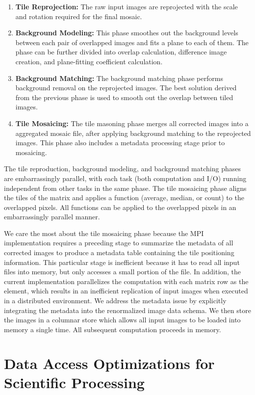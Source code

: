 \documentclass{acm_proc_article-sp}
\begin{document}
\begin{enumerate}
\item \textbf{Tile Reprojection:} The raw input images are reprojected with the scale and rotation required for the
final mosaic. 
\item \textbf{Background Modeling:} This phase smoothes out the background levels between each pair of
overlapped images and fits a plane to each of them. The phase can be further divided into overlap
calculation, difference image creation, and plane-fitting coefficient calculation.
\item \textbf{Background Matching:} The background matching phase performs background removal on the
reprojected images. The best solution derived from the previous phase is used to smooth out the overlap between
tiled images.
\item \textbf{Tile Mosaicing:} The tile masoning phase merges all corrected images into a aggregated mosaic file,
after applying background matching to the reprojected images. This phase also includes a metadata processing
stage prior to mosaicing.
\end{enumerate}

The tile reproduction, background modeling, and background matching phases are embarrassingly
parallel, with each task (both computation and I/O) running independent from other tasks in the same
phase. The tile mosaicing phase aligns the tiles of the matrix and applies a function (average, median, or count) to
the overlapped pixels. All functions can be applied to the overlapped pixels in an embarrassingly parallel manner.

We care the most about the tile mosaicing phase because the MPI implementation requires a preceding
stage to summarize the metadata of all corrected images to produce a metadata table containing the tile
positioning information. This particular stage is inefficient because it has to read all input files into memory, but
only accesses a small portion of the file. In addition, the current implementation parallelizes the computation with
each matrix row as the element, which results in an inefficient replication of input images when executed in a
distributed environment. We address the metadata issue by explicitly integrating the metadata into the
renormalized image data schema. We then store the images in a columnar store which allows all input images to
be loaded into memory a single time. All subsequent computation proceeds in memory.

\section{Data Access Optimizations for \\ Scientific Processing}
\label{sec:optimizations-scientific-processing}
\end{document}
